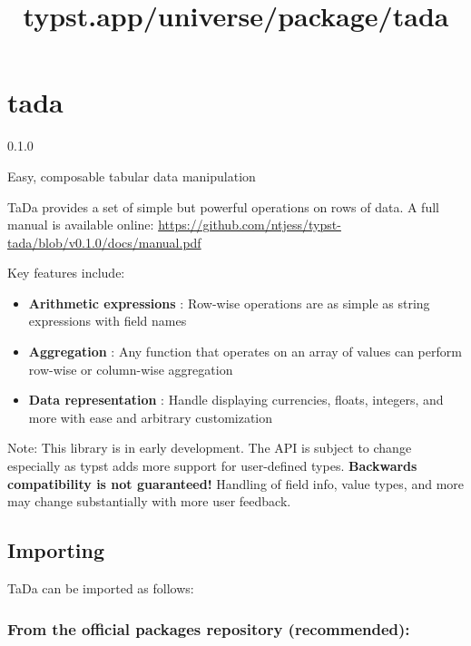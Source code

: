 \title{typst.app/universe/package/tada}

\label{banner}
\section{tada}\label{tada}

{ 0.1.0 }

Easy, composable tabular data manipulation

\label{readme}
TaDa provides a set of simple but powerful operations on rows of data. A
full manual is available online:
\url{https://github.com/ntjess/typst-tada/blob/v0.1.0/docs/manual.pdf}

Key features include:

\begin{itemize}
\item
  \textbf{Arithmetic expressions} : Row-wise operations are as simple as
  string expressions with field names
\item
  \textbf{Aggregation} : Any function that operates on an array of
  values can perform row-wise or column-wise aggregation
\item
  \textbf{Data representation} : Handle displaying currencies, floats,
  integers, and more with ease and arbitrary customization
\end{itemize}

Note: This library is in early development. The API is subject to change
especially as typst adds more support for user-defined types.
\textbf{Backwards compatibility is not guaranteed!} Handling of field
info, value types, and more may change substantially with more user
feedback.

\subsection{Importing}\label{importing}

TaDa can be imported as follows:

\subsubsection{From the official packages repository
(recommended):}\label{from-the-official-packages-repository-recommended}

\begin{Shaded}
\begin{Highlighting}[]
\end{Highlighting}
\end{Shaded}

